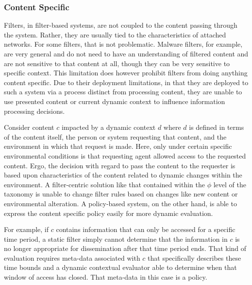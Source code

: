\subsubsection*{Content Specific}
Filters, in filter-based systems, are not coupled to the content passing through the system.  Rather, they are usually tied to the characteristics of attached networks.  For some filters, that is not problematic.  Malware filters, for example, are very general and do not need to have an understanding of filtered content and are not sensitive to that content at all, though they can be very sensitive to specific context.  This limitation does however prohibit filters from doing anything content specific.  Due to their deployment limitations, in that they are deployed to such a system via a process distinct from processing content, they are unable to use presented content or current dynamic context to influence information processing decisions.

Consider content $c$ impacted by a dynamic context $d$ where $d$ is defined in terms of the content itself, the person or system requesting that content, and the environment in which that request is made.  Here, only under certain specific environmental conditions is that requesting agent allowed access to the requested content.  Ergo, the decision with regard to pass the content to the requester is based upon characteristics of the content related to dynamic changes within the environment.  A filter-centric solution like that contained within the $\phi$ level of the taxonomy is unable to change filter rules based on changes like new content or environmental alteration.  A policy-based system, on the other hand, is able to express the content specific policy easily for more dynamic evaluation.

For example, if $c$ contains information that can only be accessed for a specific time period, a static filter simply cannot determine that the information in $c$ is no longer appropriate for dissemination after that time period ends.  That kind of evaluation requires meta-data associated with $c$ that specifically describes these time bounds and a dynamic contextual evaluator able to determine when that window of access has closed.  That meta-data in this case is a policy.

